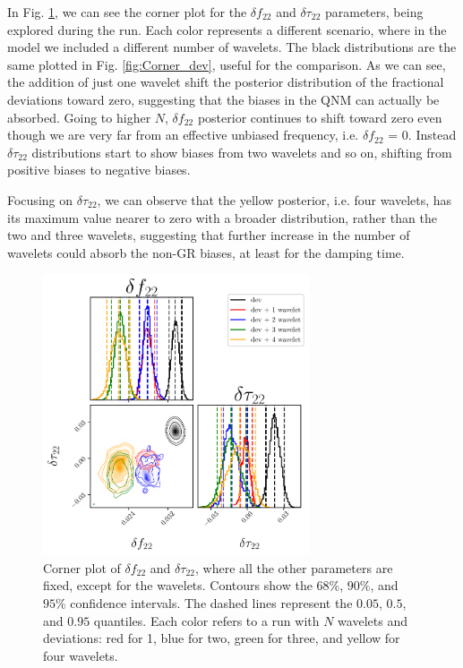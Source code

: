 In Fig. \ref{fig:Corner_wav}, we can see the corner plot for the $\delta f_{22}$ and $\delta \tau_{22}$ parameters, being explored during the run. Each color represents a different scenario, where in the model we included a different number of wavelets. The black distributions are the same plotted in Fig. \ref{fig:Corner_dev}, useful for the comparison. As we can see, the addition of just one wavelet shift the posterior distribution of the fractional deviations toward zero, suggesting that the biases in the QNM can actually be absorbed. Going to higher $N$, $\delta f_{22}$ posterior continues to shift toward zero even though we are very far from an effective unbiased frequency, i.e. $\delta f_{22}$ = 0. Instead $\delta \tau_{22}$ distributions start to show biases from two wavelets and so on, shifting from positive biases to negative biases. 

Focusing on $\delta \tau_{22}$, we can observe that the yellow posterior, i.e. four wavelets, has its maximum value nearer to zero with a broader distribution, rather than the two and three wavelets, suggesting that further increase in the number of wavelets could absorb the non-GR biases, at least for the damping time. 



\begin{figure}[h!]
    \centering
    \includegraphics[width=0.7\textwidth]{Images/Corner_wav.pdf}
    \caption{Corner plot of $\delta f_{22}$ and $\delta \tau_{22}$, where all the other parameters are fixed, except for the wavelets. Contours show the $68\%$, $90\%$, and $95\%$ confidence intervals. The dashed lines represent the $0.05$, $0.5$, and $0.95$ quantiles. Each color refers to a run with $N$ wavelets and deviations: red for 1, blue for two, green for three, and  yellow for four wavelets.}
    \label{fig:Corner_wav}
\end{figure}


